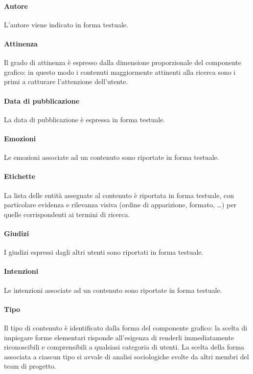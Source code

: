 \paragraph{Autore}
L'autore viene indicato in forma testuale.
\paragraph{Attinenza}
Il grado di attinenza è espresso dalla dimensione proporzionale del componente grafico: in questo modo i contenuti maggiormente attinenti alla ricerca sono i primi a catturare l'attenzione dell'utente.
\paragraph{Data di pubblicazione}
La data di pubblicazione è espressa in forma testuale.
\paragraph{Emozioni}
Le emozioni associate ad un contenuto sono riportate in forma testuale.
\paragraph{Etichette}
La lista delle entità assegnate al contenuto è riportata in forma testuale, con particolare evidenza e rilevanza visiva (ordine di apparizione, formato, \ldots) per quelle corrispondenti ai termini di ricerca.
\paragraph{Giudizi}
I giudizi espressi dagli altri utenti sono riportati in forma testuale.
\paragraph{Intenzioni}
Le intenzioni associate ad un contenuto sono riportate in forma testuale.
\paragraph{Tipo}
Il tipo di contenuto è identificato dalla forma del componente grafico: la scelta di impiegare forme elementari risponde all'esigenza di renderli immediatamente riconoscibili e comprensibili a qualsiasi categoria di utenti. La scelta della forma associata a ciascun tipo si avvale di analisi sociologiche svolte da altri membri del team di progetto.

